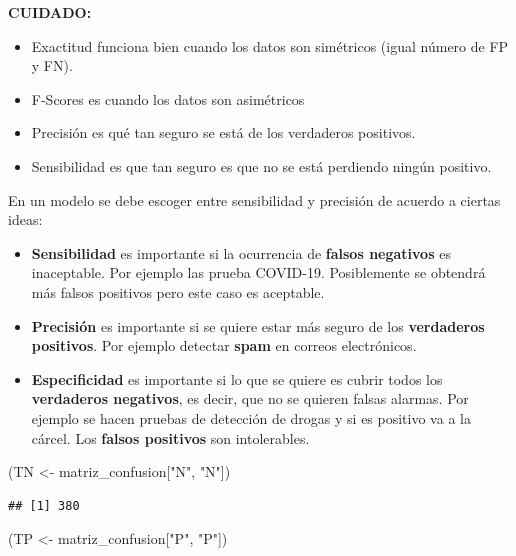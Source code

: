 \documentclass[
  12pt,
]{book}
\newenvironment{Shaded}{\begin{snugshade}}{\end{snugshade}}
\newcommand{\NormalTok}[1]{#1}
\newcommand{\OtherTok}[1]{\textcolor[rgb]{0.56,0.35,0.01}{#1}}
\newcommand{\StringTok}[1]{\textcolor[rgb]{0.31,0.60,0.02}{#1}}
\providecommand{\tightlist}{%
  \setlength{\itemsep}{0pt}\setlength{\parskip}{0pt}}
\theoremstyle{definition}
\theoremstyle{definition}
\theoremstyle{definition}
\theoremstyle{remark}
\begin{document}
\textbf{CUIDADO:}

\begin{itemize}
\tightlist
\item
  Exactitud funciona bien cuando los datos son simétricos (igual número de FP y FN).
\item
  F-Scores es cuando los datos son asimétricos
\item
  Precisión es qué tan seguro se está de los verdaderos positivos.
\item
  Sensibilidad es que tan seguro es que no se está perdiendo ningún positivo.
\end{itemize}

En un modelo se debe escoger entre sensibilidad y precisión de acuerdo a ciertas ideas:

\begin{itemize}
\tightlist
\item
  \textbf{Sensibilidad} es importante si la ocurrencia de \textbf{falsos negativos} es inaceptable. Por ejemplo las prueba COVID-19. Posiblemente se obtendrá más falsos positivos pero este caso es aceptable.
\item
  \textbf{Precisión} es importante si se quiere estar más seguro de los \textbf{verdaderos positivos}. Por ejemplo detectar \textbf{spam} en correos electrónicos.
\item
  \textbf{Especificidad} es importante si lo que se quiere es cubrir todos los \textbf{verdaderos negativos}, es decir, que no se quieren falsas alarmas. Por ejemplo se hacen pruebas de detección de drogas y si es positivo va a la cárcel. Los \textbf{falsos positivos} son intolerables.
\end{itemize}

\begin{Shaded}
\begin{Highlighting}[]
\NormalTok{(TN }\OtherTok{\textless{}{-}}\NormalTok{ matriz\_confusion[}\StringTok{"N"}\NormalTok{, }\StringTok{"N"}\NormalTok{])}
\end{Highlighting}
\end{Shaded}

\begin{verbatim}
## [1] 380
\end{verbatim}

\begin{Shaded}
\begin{Highlighting}[]
\NormalTok{(TP }\OtherTok{\textless{}{-}}\NormalTok{ matriz\_confusion[}\StringTok{"P"}\NormalTok{, }\StringTok{"P"}\NormalTok{])}
\end{Highlighting}
\end{Shaded}
\end{document}
